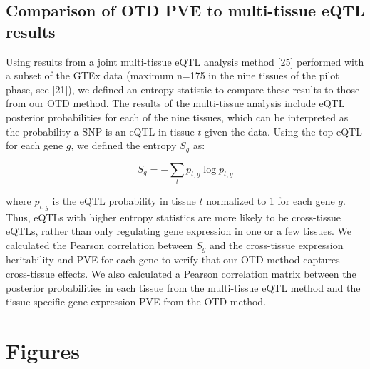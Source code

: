 \documentclass[]{article}
\begin{document}
\subsection{Comparison of OTD PVE to multi-tissue eQTL
results}\label{comparison-of-otd-pve-to-multi-tissue-eqtl-results}

Using results from a joint multi-tissue eQTL analysis method {[}25{]}
performed with a subset of the GTEx data (maximum n=175 in the nine
tissues of the pilot phase, see {[}21{]}), we defined an entropy
statistic to compare these results to those from our OTD method. The
results of the multi-tissue analysis include eQTL posterior
probabilities for each of the nine tissues, which can be interpreted as
the probability a SNP is an eQTL in tissue \(t\) given the data. Using
the top eQTL for each gene \(g\), we defined the entropy \(S_g\) as:

\[ S_g = -\sum_{t}p_{t,g} \log p_{t,g} \]

where \(p_{t,g}\) is the eQTL probability in tissue \(t\) normalized to
1 for each gene \(g\). Thus, eQTLs with higher entropy statistics are
more likely to be cross-tissue eQTLs, rather than only regulating gene
expression in one or a few tissues. We calculated the Pearson
correlation between \(S_g\) and the cross-tissue expression heritability
and PVE for each gene to verify that our OTD method captures
cross-tissue effects. We also calculated a Pearson correlation matrix
between the posterior probabilities in each tissue from the multi-tissue
eQTL method and the tissue-specific gene expression PVE from the OTD
method.

\section{Figures}\label{figures}
\end{document}
